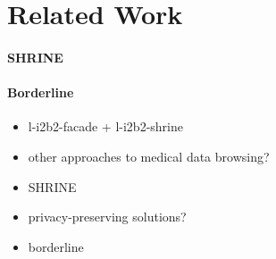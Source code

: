 \section{Related Work}

\paragraph{SHRINE}

\paragraph{Borderline}


\begin{itemize}
    \item l-i2b2-facade + l-i2b2-shrine
    \item other approaches to medical data browsing?
    \item SHRINE
    \item privacy-preserving solutions?
    \item borderline
\end{itemize}



